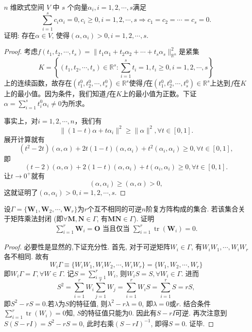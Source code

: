 \documentclass[../../main.tex]{subfiles}%
\begin{document}
\begin{example}
\( n \) 维欧式空间 \( V \) 中 \( s \) 个向量\(\alpha_i, i = 1,2,\cdots,s\)满足
\[
\sum_{i=1}^{s} c_i \alpha_i = 0, c_i \geqslant 0, i = 1,2,\cdots,s \Longrightarrow c_1 = c_2 = \cdots = c_s = 0.
\]
证明: 存在\(\alpha \in V\), 使得\((\alpha, \alpha_i) > 0, i = 1,2,\cdots,s\).
\end{example}
\begin{proof}
考虑\( f(t_1, t_2, \cdots, t_s) = \| t_1 \alpha_1 + t_2 \alpha_2 + \cdots + t_s \alpha_s \|_{\mathbb{R}^n}^2 \)是紧集
\[
K = \left\{ (t_1, t_2, \cdots, t_s) \in \mathbb{R}^s: \sum_{i=1}^s t_i = 1, t_i \geqslant 0, i = 1, 2, \cdots, s \right\}
\]
上的连续函数，故存在\( (t_1^0, t_2^0, \cdots, t_s^0) \in \mathbb{R}^s \)使得\( f \)在\( (t_1^0, t_2^0, \cdots, t_s^0) \in \mathbb{R}^s \)上达到\( f \)在\( K \)上的最小值。因为条件，我们知道\( f \)在\( K \)上的最小值为正数。下证\( \alpha = \sum_{i=1}^s t_i^0 \alpha_i \neq 0 \)为所求。

事实上，对\( i = 1, 2, \cdots, n \)，我们有
\[
\| (1 - t) \alpha + t \alpha_i \|^2 \geqslant \| \alpha \|^2, \forall t \in [0, 1].
\]
展开计算就有
\[
(t^2 - 2t) (\alpha, \alpha) + 2t (1 - t) (\alpha, \alpha_i) + t^2 (\alpha_i, \alpha_i) \geqslant 0, \forall t \in [0, 1],
\]
即
\[
(t - 2) (\alpha, \alpha) + 2 (1 - t) (\alpha, \alpha_i) + t (\alpha_i, \alpha_i) \geqslant 0, \forall t \in [0, 1].
\]
让\( t \to 0^+ \)就有
\[
(\alpha, \alpha_i) \geqslant (\alpha, \alpha) > 0,
\]
这就证明了\( (\alpha, \alpha_i) > 0, i = 1, 2, \cdots, s \).
\end{proof}

\begin{example}
设\(\varGamma = \{\boldsymbol{W}_1, \boldsymbol{W}_2, \cdots, \boldsymbol{W}_r\}\)为\(r\)个互不相同的可逆\(n\)阶复方阵构成的集合. 若该集合关于矩阵乘法封闭 (即\(\forall \boldsymbol{M}, \boldsymbol{N} \in \varGamma\), 有\(\boldsymbol{MN} \in \varGamma\)). 证明
\begin{align*}
\sum_{i=1}^r \boldsymbol{W}_i = \boldsymbol{O} \text{ 当且仅当 } \sum_{i=1}^r \operatorname{tr}\left( \boldsymbol{W}_i \right) = 0.
\end{align*}
\end{example}
\begin{proof}
必要性是显然的,下证充分性.
首先, 对于可逆矩阵\( W_i \in \varGamma \), 有\( W_iW_1, \cdots, W_iW_r \)各不相同. 故有
\[
W_i\varGamma \equiv \{ W_iW_1, W_iW_2, \cdots, W_iW_r \} = \{ W_1, W_2, \cdots, W_r \}
\]
即\( W_i\varGamma = \varGamma, \forall W \in \varGamma \).
记\( S = \sum_{i=1}^r W_i \), 则\( W_iS = S, \forall W_i \in \varGamma \). 进而
\[
S^2=\sum_{i=1}^r{W_i\sum_{j=1}^r{W_j}}=\sum_{i=1}^r{W_iS}=\sum_{i=1}^r{S}=rS,
\]
即$S^2-rS=0$.若\( \lambda \)为\( S \)的特征值, 则\( \lambda^2 - r\lambda = 0 \), 即\( \lambda = 0 \)或\( r \).
结合条件\( \sum_{i=1}^r \operatorname{tr}\left( W_i \right) = 0 \)知, \( S \)的特征值只能为\( 0 \). 因此有\( S - rI \)可逆.
再次注意到\( S(S - rI) = S^2 - rS = 0 \), 此时右乘\( (S - rI)^{-1} \), 即得\( S = 0 \). 证毕.
\end{proof}
\end{document}
